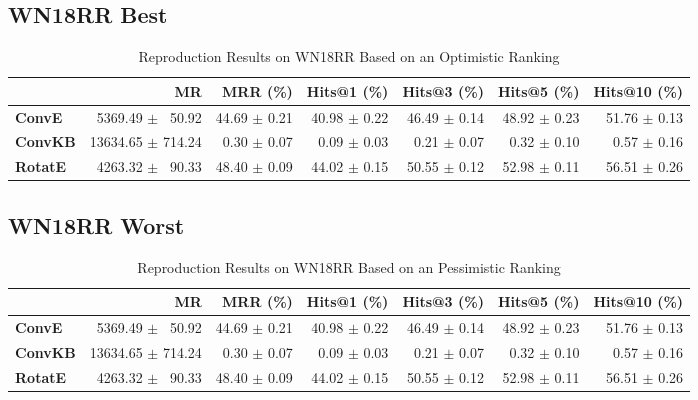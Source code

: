 \documentclass[journal]{IEEEtran}
\begin{document}
\subsection{WN18RR Best}
\begin{table*}
    \caption{Reproduction Results on WN18RR Based on an Optimistic Ranking}
    \label{tab:wn18rr_full_results_optimistic_ranking}
    \centering
    \begin{tabular}{lrrrrrr}
\toprule
{} &                 MR &      MRR (\%) &   Hits@1 (\%) &   Hits@3 (\%) &   Hits@5 (\%) &  Hits@10 (\%) \\
\midrule
\textbf{ConvE } &  $\phantom{5}$5369.49 $\pm$ $\phantom{5}$50.92 &  44.69 $\pm$ 0.21 &  40.98 $\pm$ 0.22 &  46.49 $\pm$ 0.14 &  48.92 $\pm$ 0.23 &  51.76 $\pm$ 0.13 \\
\textbf{ConvKB} &  13634.65 $\pm$ 714.24 &  $\phantom{5}$0.30 $\pm$ 0.07 &  $\phantom{5}$0.09 $\pm$ 0.03 &  $\phantom{5}$0.21 $\pm$ 0.07 &  $\phantom{5}$0.32 $\pm$ 0.10 &  $\phantom{5}$0.57 $\pm$ 0.16 \\
\textbf{RotatE} &  $\phantom{5}$4263.32 $\pm$ $\phantom{5}$90.33 &  48.40 $\pm$ 0.09 &  44.02 $\pm$ 0.15 &  50.55 $\pm$ 0.12 &  52.98 $\pm$ 0.11 &  56.51 $\pm$ 0.26 \\
\bottomrule
\end{tabular}

\end{table*}
\subsection{WN18RR Worst}
    \begin{table*}
        \caption{Reproduction Results on WN18RR Based on an Pessimistic Ranking}
        \label{tab:wn18rr_full_results_pessimistic_ranking}
        \centering
        \begin{tabular}{lrrrrrr}
\toprule
{} &                 MR &      MRR (\%) &   Hits@1 (\%) &   Hits@3 (\%) &   Hits@5 (\%) &  Hits@10 (\%) \\
\midrule
\textbf{ConvE } &  $\phantom{5}$5369.49 $\pm$ $\phantom{5}$50.92 &  44.69 $\pm$ 0.21 &  40.98 $\pm$ 0.22 &  46.49 $\pm$ 0.14 &  48.92 $\pm$ 0.23 &  51.76 $\pm$ 0.13 \\
\textbf{ConvKB} &  13634.65 $\pm$ 714.24 &  $\phantom{5}$0.30 $\pm$ 0.07 &  $\phantom{5}$0.09 $\pm$ 0.03 &  $\phantom{5}$0.21 $\pm$ 0.07 &  $\phantom{5}$0.32 $\pm$ 0.10 &  $\phantom{5}$0.57 $\pm$ 0.16 \\
\textbf{RotatE} &  $\phantom{5}$4263.32 $\pm$ $\phantom{5}$90.33 &  48.40 $\pm$ 0.09 &  44.02 $\pm$ 0.15 &  50.55 $\pm$ 0.12 &  52.98 $\pm$ 0.11 &  56.51 $\pm$ 0.26 \\
\bottomrule
\end{tabular}

    \end{table*}
\end{document}
